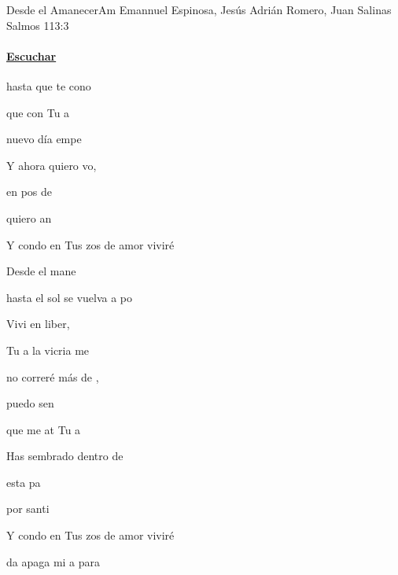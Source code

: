 \documentclass[12pt, spanish]{book}
\begin{document}
    \begin{song}{Desde el Amanecer}{Am}
    {} %
    {Emannuel Espinosa, Jesús Adrián Romero, Juan Salinas}
    {Salmos 113:3} %
    {}
        \ifChordBk
        \paragraph{\mbox{}\hfill\protect\href{https://open.spotify.com/intl-es/track/7mcV2OhsG4VXxeaxEpl1iU}{Escuchar}\mbox{}\hfill}
        \fi

        \begin{SBOpGroup}
             hasta que te cono

            que con Tu a

             nuevo día empe

            Y ahora quiero vo,

            en pos de 

            quiero an

            Y condo en Tus zos de amor viviré
        \end{SBOpGroup}

        \begin{SBChorus}
            Desde el mane

            hasta  el sol se vuelva a po

            Vivi en liber,

            Tu a la vicria me 
        \end{SBChorus}

        \begin{SBOpGroup}
             no correré más de ,

            puedo sen

            que me at Tu a

            Has sembrado dentro de 

            esta pa

            por santi

            Y condo en Tus zos de amor viviré
        \end{SBOpGroup}

        \begin{SBOpGroup}
            da apaga mi a para 


\end{SBOpGroup}
\end{song}
\end{document}
